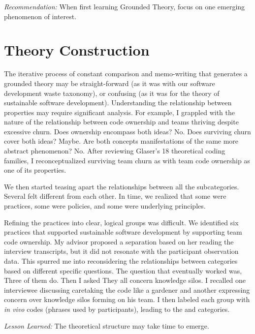 \textit{Recommendation:} When first learning Grounded Theory, focus on one emerging phenomenon of interest. 
\section{Theory Construction}
\label{TheoryConstruction}

The iterative process of constant comparison and memo-writing that generates a grounded theory may be straight-forward (as it was with our software development waste taxonomy), or confusing (as it was for the theory of sustainable software development). Understanding the relationship between properties may require significant analysis. For example, I grappled with the nature of the relationship between code ownership and teams thriving despite excessive churn. Does ownership encompass both ideas? No. Does surviving churn cover both ideas? Maybe. Are both concepts manifestations of the same more abstract phenomenon? No. After reviewing Glaser's 18 theoretical coding families, I reconceptualized surviving team churn as  with team code ownership as one of its properties. 

We then started teasing apart the relationships between all the subcategories. Several felt different from each other. In time, we realized that some were practices, some were policies, and some were underlying principles. 

Refining the practices into clear, logical groups was difficult. We identified six practices that supported sustainable software development by supporting team code ownership. My advisor proposed a separation based on her reading the interview transcripts, but it did not resonate with the participant observation data. This spurred me into reconsidering the relationships between categories based on different specific questions. The question that eventually worked was,  Three of them do. Then I asked  They all concern knowledge silos. I recalled one interviewee discussing caretaking the code like a gardener and another expressing concern over knowledge silos forming on his team. I then labeled each group with \textit{in vivo} codes (phrases used by participants), leading to the  and  categories. 

\textit{Lesson Learned:} The theoretical structure may take time to emerge.

